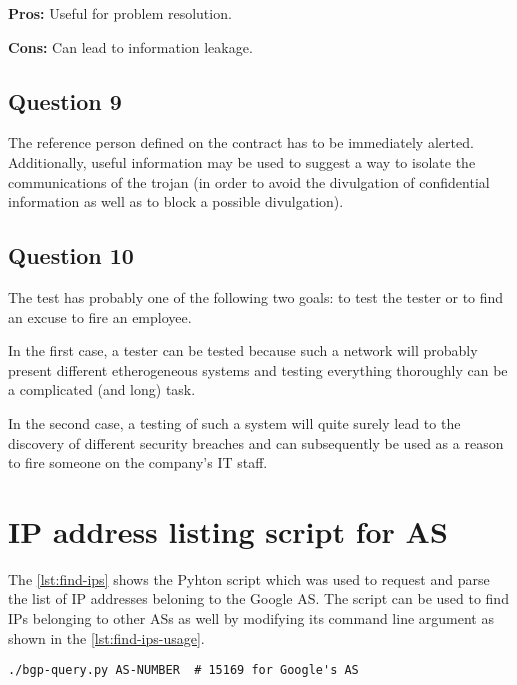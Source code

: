 \documentclass[10pt,a4paper,twoside,onecolumn]{article}
\begin{document}
\begin{description}[noitemsep]
	\item{\textbf{Pros:}} Useful for problem resolution.
	\item{\textbf{Cons:}} Can lead to information leakage.
\end{description}

\subsection{Question 9}

The reference person defined on the contract has to be immediately alerted. Additionally, useful information may be used to suggest a way to isolate the communications of the trojan (in order to avoid the divulgation of confidential information as well as to block a possible divulgation).

\subsection{Question 10}

The test has probably one of the following two goals: to test the tester or to find an excuse to fire an employee.

In the first case, a tester can be tested because such a network will probably present different etherogeneous systems and testing everything thoroughly can be a complicated (and long) task.

In the second case, a testing of such a system will quite surely lead to the discovery of different security breaches and can subsequently be used as a reason to fire someone on the company's IT staff.

\appendix

\cleardoublepage
\section{IP address listing script for AS}
\label{apx:bgp-script}

The \autoref{lst:find-ips} shows the Pyhton script which was used to request and parse the list of IP addresses beloning to the Google AS. The script can be used to find IPs belonging to other ASs as well by modifying its command line argument as shown in the \autoref{lst:find-ips-usage}.

\vspace*{5mm}

\lstset{caption=,label=lst:find-ips-usage,language=bash,numbers=none}
\begin{lstlisting}
./bgp-query.py AS-NUMBER  # 15169 for Google's AS
\end{lstlisting}
\end{document}
